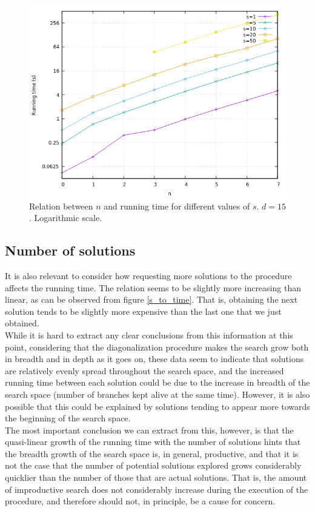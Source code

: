 \documentclass[12pt,a4paper]{article}
\begin{document}
\begin{figure}
\centering
\caption{\label{n_to_time}Relation between $n$ and running time for different values of $s$. $d = 15$. Logarithmic scale.}
\includegraphics[width=1\textwidth]{n_to_time.png}
\end{figure}

\subsection{Number of solutions}

It is also relevant to consider how requesting more solutions to the procedure affects the running time. The relation seems to be slightly more increasing than linear, as can be observed from figure \ref{s_to_time}. That is, obtaining the next solution tends to be slightly more expensive than the last one that we just obtained.\\

While it is hard to extract any clear conclusions from this information at this point, considering that the diagonalization procedure makes the search grow both in breadth and in depth as it goes on, these data seem to indicate that solutions are relatively evenly spread throughout the search space, and the increased running time between each solution could be due to the increase in breadth of the search space (number of branches kept alive at the same time). However, it is also possible that this could be explained by solutions tending to appear more towards the beginning of the search space.\\

The most important conclusion we can extract from this, however, is that the quasi-linear growth of the running time with the number of solutions hints that the breadth growth of the search space is, in general, productive, and that it is not the case that the number of potential solutions explored grows considerably quicklier than the number of those that are actual solutions. That is, the amount of improductive search does not considerably increase during the execution of the procedure, and therefore should not, in principle, be a cause for concern.
\end{document}
